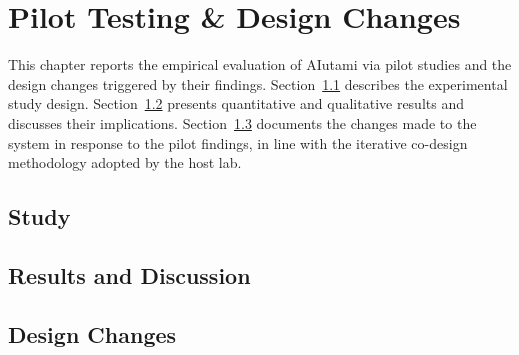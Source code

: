 \chapter{Pilot Testing \& Design Changes}
\label{ch:pilot}


This chapter reports the empirical evaluation of AIutami via pilot
studies and the design changes triggered by their findings.
Section~\ref{sec:pilot-study} describes the experimental study design.
Section~\ref{sec:pilot-results} presents quantitative and qualitative
results and discusses their implications.
Section~\ref{sec:pilot-design-changes} documents the changes made to
the system in response to the pilot findings, in line with the
iterative co-design methodology adopted by the host lab.

\section{Study}
\label{sec:pilot-study}

\section{Results and Discussion}
\label{sec:pilot-results}

\section{Design Changes}
\label{sec:pilot-design-changes}
